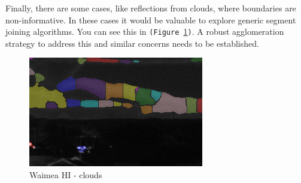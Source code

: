 \documentclass[11pt,twocolumn]{article} %
\begin{document}
Finally, there are some cases, like reflections from clouds, where boundaries are non-informative. In these cases it would be valuable to explore generic segment joining algorithms. You can see this in \texttt{(Figure~\ref{fig:clouds})}. A robust agglomeration strategy to address this and similar concerns needs to be established.

\begin{figure}
  \includegraphics[width=\columnwidth]{./images/clouds.png}
  \caption{Waimea HI - clouds}
  \label{fig:clouds}
\end{figure}

{}

\end{document}
